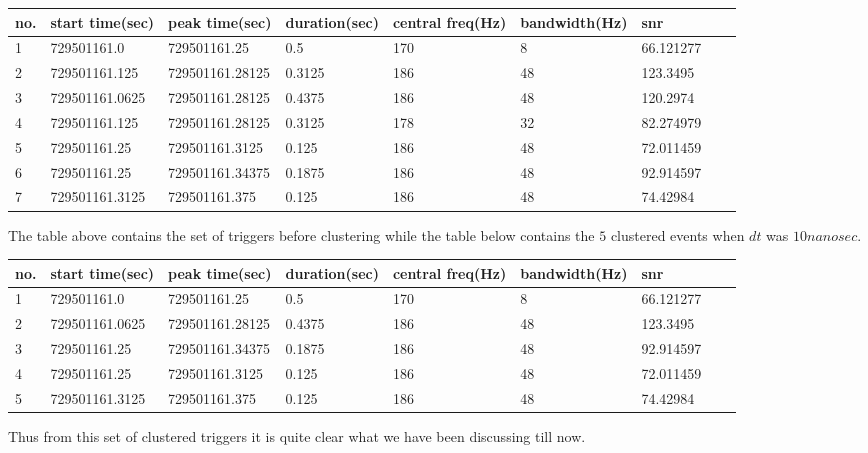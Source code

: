 \documentclass{article}
\begin{document}
\begin{tabular}{||l|l|l|l|l|l|l|lr||} \hline
no. & start time(sec) & peak time(sec) & duration(sec) & central freq(Hz) & bandwidth(Hz) & snr \\ \hline
1 &729501161.0  & 729501161.25  & 0.5     & 170  & 8   & 66.121277 \\ \hline
2 &729501161.125  & 729501161.28125  & 0.3125  & 186  & 48  & 123.3495 \\ \hline
3 &729501161.0625  & 729501161.28125  & 0.4375  & 186  & 48  & 120.2974 \\ \hline
4 &729501161.125 &729501161.28125 &0.3125 &178 &32 &82.274979 \\ \hline
5 &729501161.25 &729501161.3125 &0.125 &186 &48 &72.011459  \\ \hline
6 &729501161.25 &729501161.34375 &0.1875 &186 &48 & 92.914597 \\ \hline
7 &729501161.3125 &729501161.375 &0.125 & 186 &48 & 74.42984 \\ \hline
\end{tabular}

\vspace{0.1 in} 

The table above contains the set of triggers before clustering while   
the table below contains the $5$ clustered events when $dt$ 
was $10 nanosec$.

\vspace{0.1 in}

\begin{tabular}{||l|l|l|l|l|l|l|lr||} \hline
no. & start time(sec) & peak time(sec) & duration(sec) & central freq(Hz) & bandwidth(Hz) & snr \\ \hline
1 &729501161.0 &729501161.25 &0.5 &170 &8 & 66.121277 \\ \hline
2 &729501161.0625 &729501161.28125 &0.4375 &186 &48 &123.3495 \\ \hline
3 &729501161.25 &729501161.34375 &0.1875 &186 &48 &92.914597 \\ \hline
4 &729501161.25 &729501161.3125 &0.125 &186 &48 &72.011459 \\ \hline
5 &729501161.3125 &729501161.375 &0.125 &186 &48 &74.42984 \\ \hline 
\end{tabular}

\vspace{0.1 in}

Thus from this set of clustered triggers it is quite clear what we have been 
discussing till now.
\end{document}
